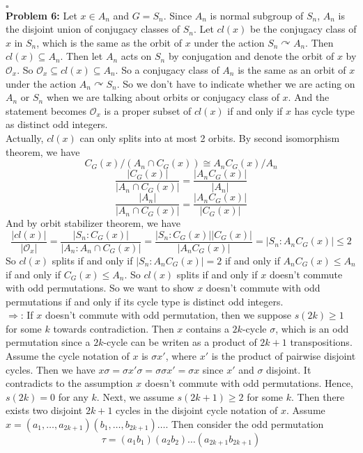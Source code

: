 \documentclass[12pt]{amsart}
\newcommand{\Orbit}{\mathcal{O}}
\begin{document}
\\\phantom{qed}\hfill$\square$\\
\textbf{Problem 6:} Let $x\in A_n$ and $G=S_n$. Since $A_n$ is normal subgroup of $S_n$, $A_n$ is the disjoint union of conjugacy classes of $S_n$. Let $cl(x)$ be the conjugacy class of $x$ in $S_n$, which is the same as the orbit of $x$ under the action $S_n\curvearrowright A_n$. Then $cl(x)\subseteq A_n$. Then let $A_n$ acts on $S_n$ by conjugation and denote the orbit of $x$ by $\Orbit_x$. So $\Orbit_x\subseteq cl(x)\subseteq A_n$. So a conjugacy class of $A_n$ is the same as an orbit of $x$ under the action $A_n\curvearrowright S_n$. So we don't have to indicate whether we are acting on $A_n$ or $S_n$ when we are talking about orbits or conjugacy class of $x$. And the statement becomes  $\Orbit_x$ is a proper subset of $cl(x)$ if and only if $x$ has cycle type as distinct odd integers.\\
Actually, $cl(x)$ can only splits into at most 2 orbits. By second isomorphism theorem, we have 
\[C_G(x)/(A_n\cap C_G(x))\cong A_nC_G(x)/A_n\]
\[\frac{|C_G(x)|}{|A_n\cap C_G(x)|}=\frac{|A_nC_G(x)|}{|A_n|}\]
\[\frac{|A_n|}{|A_n\cap C_G(x)|}=\frac{|A_nC_G(x)|}{|C_G(x)|}\tag{1}\]
And by orbit stabilizer theorem, we have
\[\frac{|cl(x)|}{|\Orbit_x|}=\frac{|S_n:C_G(x)|}{|A_n:A_n\cap C_G(x)|}=\frac{|S_n:C_G(x)||C_G(x)|}{|A_nC_G(x)|}=|S_n:A_nC_G(x)|\leq 2\]
So $cl(x)$ splits if and only if $|S_n:A_nC_G(x)|=2$ if and only if 
$A_nC_G(x)\leq A_n$ if and only if $C_G(x)\leq A_n$. So $cl(x)$ splits if and only if $x$ doesn't commute with odd permutations. So we want to show $x$ doesn't commute with odd permutations if and only if its cycle type is distinct odd integers.\\
$\Rightarrow$: If $x$ doesn't commute with odd permutation, then we suppose $s(2k)\geq 1$ for some $k$ towards contradiction. Then $x$ contains a $2k$-cycle $\sigma$, which is an odd permutation since a $2k$-cycle can be writen as a product of $2k+1$ transpositions. Assume the cycle notation of $x$ is $\sigma x'$, where $x'$ is the product of pairwise disjoint cycles. Then we have $x\sigma=\sigma x'\sigma=\sigma \sigma x'=\sigma x$ since $x'$ and $\sigma$ disjoint. It contradicts to the assumption $x$ doesn't commute with odd permutations. Hence, $s(2k)=0$ for any $k$. Next, we assume $s(2k+1)\geq 2$ for some $k$. Then there exists two disjoint $2k+1$ cycles in the disjoint cycle notation of $x$. Assume $x=(a_1,\dots ,a_{2k+1})(b_1,\dots ,b_{2k+1})\dots$. Then consider the odd permutation
\[\tau=(a_1b_1)(a_2b_2)\dots (a_{2k+1}b_{2k+1})\]
\end{document}
